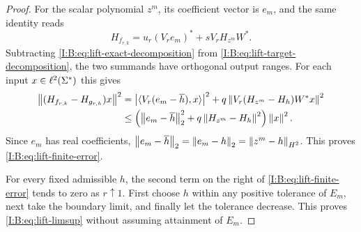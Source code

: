 \begin{proof}
For the scalar polynomial $z^m$, its coefficient vector is $e_m$, and
the same identity reads
\begin{equation}
 H_{f_{r,k}}=u_r(V_re_m)^*+sV_rH_{z^m}W^*.
 \label{I:B:eq:lift-target-decomposition}
\end{equation}
Subtracting \eqref{I:B:eq:lift-exact-decomposition} from
\eqref{I:B:eq:lift-target-decomposition}, the two summands have orthogonal
output ranges. For each input $x\in\ell^2(\Sigma^*)$ this gives
\begin{align*}
 \left\lVert(H_{f_{r,k}}-H_{g_{r,h}})x\right\rVert^2
 &=\bigl|\langle V_r(e_m-\overline h),x\rangle\bigr|^2
   +q\left\lVert V_r(H_{z^m}-H_h)W^*x\right\rVert^2\\
 &\le\left(\left\lVert e_m-\overline h\right\rVert_2^2
           +q\left\lVert H_{z^m}-H_h\right\rVert^2\right)\left\lVert x\right\rVert^2.
\end{align*}
Since $e_m$ has real coefficients,
$\left\lVert e_m-\overline h\right\rVert_2=\left\lVert e_m-h\right\rVert_2
=\left\lVert z^m-h\right\rVert_{H^2}$. This proves
\eqref{I:B:eq:lift-finite-error}.

For every fixed admissible $h$, the second term on the right of
\eqref{I:B:eq:lift-finite-error} tends to zero as $r\uparrow1$. First choose
$h$ within any positive tolerance of $E_m$, next take the boundary limit,
and finally let the tolerance decrease. This proves
\eqref{I:B:eq:lift-limsup} without assuming attainment of $E_m$.
\end{proof}
